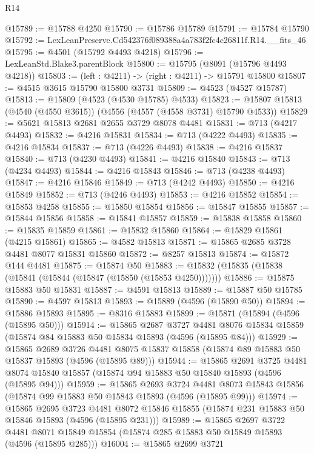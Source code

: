 \begin{lexlean}{R14}
\begin{coremodule}
@15789 := @15788 @4250
@15790 := @15786 @15789
@15791 := @15784 @15790
@15792 := LexLeanPreserve.Cd542376f089388a4a783f2fc4c26811f.R14.__fits_46
@15795 := @4501 (@15792 @4493 @4218)
@15796 := LexLeanStd.Blake3.parentBlock
@15800 := @15795 (@8091 (@15796 @4493 @4218))
@15803 := (left : @4211) -> (right : @4211) -> @15791 @15800
@15807 := @4515 @3615 @15790 @15800 @3731
@15809 := @4523 (@4527 @15787)
@15813 := @15809 (@4523 (@4530 @15785) @4533)
@15823 := @15807 @15813 (@4540 (@4550 @3615)) (@4556 (@4557 (@4558 @3731) @15790 @4533))
@15829 := @5621 @15813 @2681 @2655 @3729 @8078 @4481
@15831 := @713 (@4217 @4493)
@15832 := @4216 @15831
@15834 := @713 (@4222 @4493)
@15835 := @4216 @15834
@15837 := @713 (@4226 @4493)
@15838 := @4216 @15837
@15840 := @713 (@4230 @4493)
@15841 := @4216 @15840
@15843 := @713 (@4234 @4493)
@15844 := @4216 @15843
@15846 := @713 (@4238 @4493)
@15847 := @4216 @15846
@15849 := @713 (@4242 @4493)
@15850 := @4216 @15849
@15852 := @713 (@4246 @4493)
@15853 := @4216 @15852
@15854 := @15853 @4258
@15855 := @15850 @15854
@15856 := @15847 @15855
@15857 := @15844 @15856
@15858 := @15841 @15857
@15859 := @15838 @15858
@15860 := @15835 @15859
@15861 := @15832 @15860
@15864 := @15829 @15861 (@4215 @15861)
@15865 := @4582 @15813
@15871 := @15865 @2685 @3728 @4481 @8077 @15831 @15860
@15872 := @8257 @15813
@15874 := @15872 @144 @4481
@15875 := @15874 @50
@15883 := @15832 (@15835 (@15838 (@15841 (@15844 (@15847 (@15850 (@15853 @4250)))))))
@15886 := @15875 @15883 @50 @15831
@15887 := @4591 @15813
@15889 := @15887 @50 @15785
@15890 := @4597 @15813
@15893 := @15889 (@4596 (@15890 @50))
@15894 := @15886 @15893
@15895 := @8316 @15883
@15899 := @15871 (@15894 (@4596 (@15895 @50)))
@15914 := @15865
    @2687
    @3727
    @4481
    @8076
    @15834
    @15859
    (@15874 @84 @15883 @50 @15834 @15893 (@4596 (@15895 @84)))
@15929 := @15865
    @2689
    @3726
    @4481
    @8075
    @15837
    @15858
    (@15874 @89 @15883 @50 @15837 @15893 (@4596 (@15895 @89)))
@15944 := @15865
    @2691
    @3725
    @4481
    @8074
    @15840
    @15857
    (@15874 @94 @15883 @50 @15840 @15893 (@4596 (@15895 @94)))
@15959 := @15865
    @2693
    @3724
    @4481
    @8073
    @15843
    @15856
    (@15874 @99 @15883 @50 @15843 @15893 (@4596 (@15895 @99)))
@15974 := @15865
    @2695
    @3723
    @4481
    @8072
    @15846
    @15855
    (@15874 @231 @15883 @50 @15846 @15893 (@4596 (@15895 @231)))
@15989 := @15865
    @2697
    @3722
    @4481
    @8071
    @15849
    @15854
    (@15874 @285 @15883 @50 @15849 @15893 (@4596 (@15895 @285)))
@16004 := @15865
    @2699
    @3721

\end{coremodule}
\end{lexlean}

